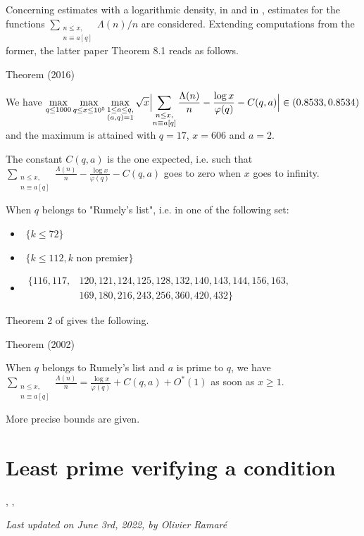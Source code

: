 \par 
Concerning estimates with a logarithmic density, in
\cite{Ramare*02}
and in
\cite{Ramare*12-0},
estimates for the functions
$\displaystyle\sum_{\substack{n\le x,\\ n\equiv a[q]}}\Lambda(n)/n$
are considered.
Extending computations from the former, the latter paper Theorem 8.1
reads as follows.
\begin{thm}{Theorem (2016)}

  We have
  $\displaystyle
  \max_{q\le 1000}\max_{q\le x\le 10^5}\max_{\substack{1\le a\le q,\\
  (a,q)=1}}
  \sqrt{x}\Bigl|
  \sum_{\substack{n\le x,\\ n\equiv a[q]}}\frac{\Lambda(n)}{n}
  -\frac{\log x}{\varphi(q)}-C(q,a)\Bigr|\in(0.8533,0.8534)
  $
  and the maximum is attained with $q=17$, $x=606$ and $a=2$.
\end{thm}

The constant $C(q,a)$ is the one expected, i.e. such that
$\sum_{\substack{n\le x,\\ n\equiv a[q]}}\frac{\Lambda(n)}{n}
-\frac{\log x}{\varphi(q)}-C(q,a)$ goes to
zero when $x$ goes to infinity.

\par 
  When $q$ belongs to "Rumely's list", i.e. in one of the
following set:
\begin{itemize}
    \item \,\,$\{k\le 72\}$

    \item \,\,$\{k\le 112, \text{$k$ non premier}\}$

    \item \,$\begin{aligned}\{116, 117, &120, 121, 124, 125, 128, 132, 140,
     143, 144, 156, 163, \\ &169, 180, 216, 243, 256, 360, 420, 432\}\end{aligned}$

\end{itemize}
Theorem 2 of
\cite{Ramare*02}
gives the following.
\begin{thm}{Theorem (2002)}

  When $q$ belongs to Rumely's list and $a$ is prime to $q$, we have
  $\displaystyle
  \sum_{\substack{n\le x,\\ n\equiv a[q]}}\frac{\Lambda(n)}{n}
  =\frac{\log x}{\varphi(q)}+C(q,a)+O^*(1)
  $
  as soon as $x\ge1$.
\end{thm}

More precise bounds are given.




\section{Least prime verifying a condition}


\cite{Bach-Sorenson*96},
\cite{Kadiri*05-2},







  
\begin{flushright}\small\sl{}   Last updated on June 3rd, 2022, by Olivier Ramar\'e
 \end{flushright}
















